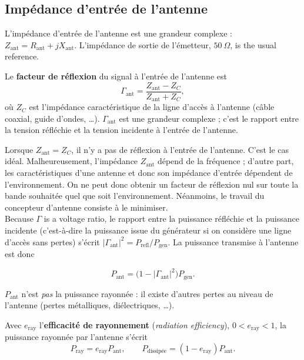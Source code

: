 \subsection{Impédance d'entrée de l'antenne}

L'impédance d'entrée de l'antenne est une grandeur complexe :
$Z_{\mathrm{ant}} = R_{\mathrm{ant}} + j X_{\mathrm{ant}}$. L'impédance de
sortie de l'émetteur, $50\ \Omega$, is the usual reference.

\begin{definition}
  Le \textbf{facteur de réflexion} du signal à l'entrée de l'antenne est
  \[ \Gamma_{\mathrm{ant}} = \frac{Z_{\mathrm{ant}} - Z_C}{Z_{\mathrm{ant}} + Z_C}, \]
  où $Z_C$ est l'impédance caractéristique de la ligne d'accès à l'antenne
  (câble coaxial, guide d'ondes, \ldots). $\Gamma_{\mathrm{ant}}$ est une
  grandeur complexe ; c'est le rapport entre la tension réfléchie et la
  tension incidente à l'entrée de l'antenne.
\end{definition}

Lorsque $Z_{\mathrm{ant}} = Z_C$, il n'y a pas de réflexion à l'entrée de
l'antenne. C'est le cas idéal. Malheureusement, l'impédance $Z_{\mathrm{ant}}$
dépend de la fréquence ; d'autre part, les caractéristiques d'une antenne et
donc son impédance d'entrée dépendent de l'environnement. On ne peut donc
obtenir un facteur de réflexion nul sur toute la bande souhaitée quel que soit
l'environnement. Néanmoins, le travail du concepteur d'antenne consiste à le
minimiser.\\

Because $\Gamma$ is a voltage ratio, le rapport entre la puissance réfléchie et
la puissance incidente (c'est-à-dire la puissance issue du générateur si on
considère une ligne d'accès sans pertes) s'écrit
$|\Gamma_{\mathrm{ant}}|^2 = P_{\mathrm{refl}} / P_{\mathrm{gen}}$. La
puissance transmise à l'antenne est donc

\[ \boxed{P_{\mathrm{ant}} = \bigl(1 - |\Gamma_{\mathrm{ant}}|^2\bigr) P_{\mathrm{gen}}.} \]

$P_{\mathrm{ant}}$ n'est \emph{pas} la puissance rayonnée : il existe d'autres
pertes au niveau de l'antenne (pertes métalliques, diélectriques, \ldots).

\begin{definition}
  Avec $e_{\mathrm{ray}}$ l'\textbf{efficacité de rayonnement}
  (\textit{radiation efficiency}), $0 < e_{\mathrm{ray}} < 1$, la puissance
  rayonnée par l'antenne s'écrit
  \[ P_{\mathrm{ray}} = e_{\mathrm{ray}} P_{\mathrm{ant}}, \qquad
     P_{\text{dissipée}} = (1 - e_{\mathrm{ray}}) P_{\mathrm{ant}}. \]
\end{definition}

